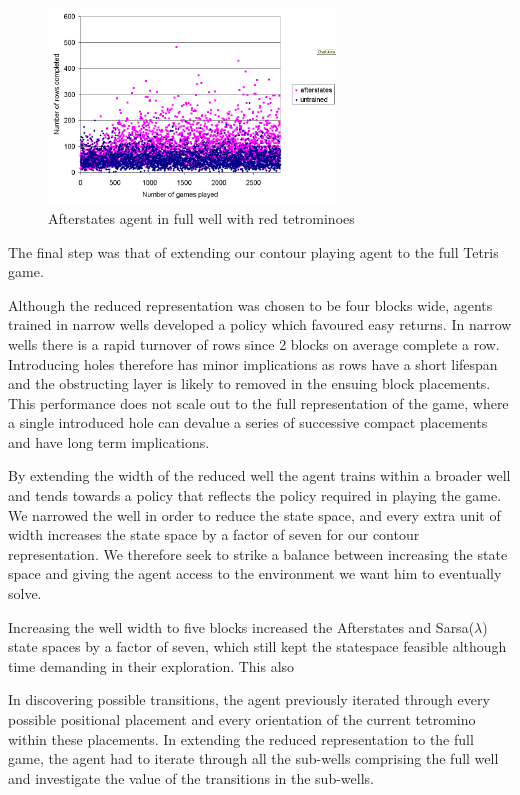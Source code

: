 \documentclass{rucsthesis}
\begin{document}
\begin{figure}[h]
\centering
\includegraphics[width=3in]{Afterstatesheightredtetfullwell.png}
\caption{Afterstates agent in full well with red tetrominoes}
\label{fig:comparemelax}
\end{figure}

The final step was that of extending our contour playing agent to the full Tetris game.

Although the reduced representation was chosen to be four blocks wide, agents trained in narrow wells developed a policy which favoured easy returns. In narrow wells there is a rapid turnover of rows since 2 blocks on average complete a row. Introducing holes therefore has minor implications as rows have a short lifespan and the obstructing layer is likely to removed in the ensuing block placements. This performance does not scale out to the full representation of the game, where a single introduced hole can devalue a series of successive compact placements and have long term implications.

By extending the width of the reduced well the agent trains within a broader well and tends towards a policy that reflects the policy required in playing the game. We narrowed the well in order to reduce the state space, and every extra unit of width increases the state space by a factor of seven for our contour representation. We therefore seek to strike a balance between increasing the state space and giving the agent access to the environment we want him to eventually solve.

Increasing the well width to five blocks increased the Afterstates and Sarsa($\lambda$) state spaces by a factor of seven, which still kept the statespace feasible although time demanding in their exploration. This also 
 
In discovering possible transitions, the agent previously iterated through every possible positional placement and every orientation of the current tetromino within these placements. In extending the reduced representation to the full game, the agent had to iterate through all the sub-wells comprising the full well and investigate the value of the transitions in the sub-wells.
\end{document}
